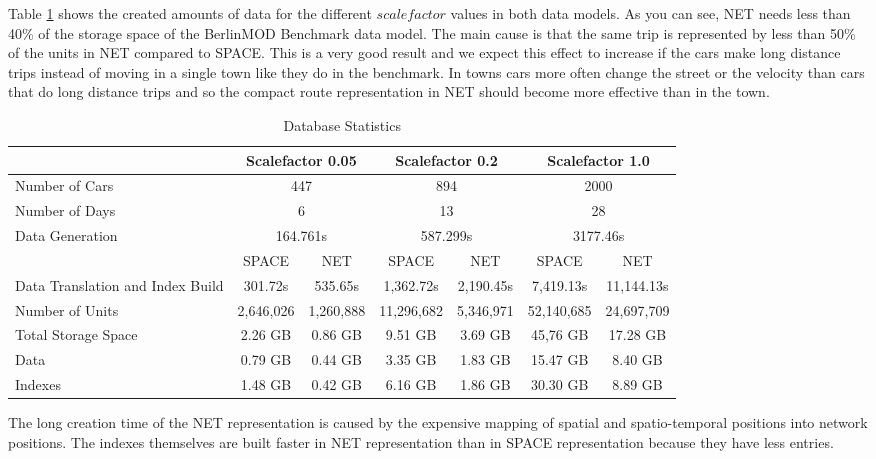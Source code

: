 \documentclass[a4paper]{article}
\newcommand{\bmodb} {BerlinMOD Benchmark}
\begin{document}
Table \ref{tab:dbstat} shows the created amounts of data for the different
$scalefactor$ values in both data models. As you can see, NET needs less
than 40\% of the storage space of the \bmodb{} data model. The main cause is that
the same trip is represented by less than 50\% of the units in NET
compared to SPACE. This is a very good result and we expect this effect to
increase if the cars make long distance
trips instead of moving in a single town like they do in the benchmark. In towns
cars more often change the street or the velocity than cars that do long distance
trips and so the compact route representation in NET should become
more effective than in the town.
\begin{table}[H]
\begin{center}
\begin{scriptsize}
\begin{tabularx}{1.0\textwidth}{|X|c|c|c|c|c|c|}
\hline
&\multicolumn{2}{c|}{\textbf{Scalefactor 0.05}}&\multicolumn{2}{c|}{\textbf{Scalefactor 0.2}}&\multicolumn{2}{c|}{\textbf{Scalefactor 1.0}}\\
\hline
Number of Cars&\multicolumn{2}{c|}{447}&\multicolumn{2}{c|}{894}&\multicolumn{2}{c|}{2000}\\
\hline
Number of Days&\multicolumn{2}{c|}{6}&\multicolumn{2}{c|}{13}&\multicolumn{2}{c|}{28}\\
\hline
Data Generation&\multicolumn{2}{c|}{164.761s}&\multicolumn{2}{c|}{587.299s}&\multicolumn{2}{c|}{3177.46s}\\
\hline
&SPACE&NET&SPACE&NET&SPACE&NET\\
\hline
Data Translation
and Index Build&301.72s&535.65s&1,362.72s&2,190.45s&7,419.13s&11,144.13s\\
\hline
Number of Units&2,646,026&1,260,888&11,296,682&5,346,971&52,140,685&24,697,709\\
\hline
Total Storage Space&2.26 GB&0.86 GB&9.51 GB&3.69 GB&45,76 GB&17.28 GB\\
Data&0.79 GB&0.44 GB&3.35 GB&1.83 GB&15.47 GB& 8.40 GB\\
Indexes&1.48 GB&0.42 GB&6.16 GB&1.86 GB&30.30 GB&8.89 GB\\
\hline
\end{tabularx}
\end{scriptsize}
\caption{Database Statistics}
\label{tab:dbstat}
\end{center}
\end{table}
The long creation time of the NET representation is
caused by the expensive mapping of spatial and spatio-temporal positions into
network positions. The indexes themselves are built faster in NET representation
than in SPACE representation because they have less entries.
\end{document}
